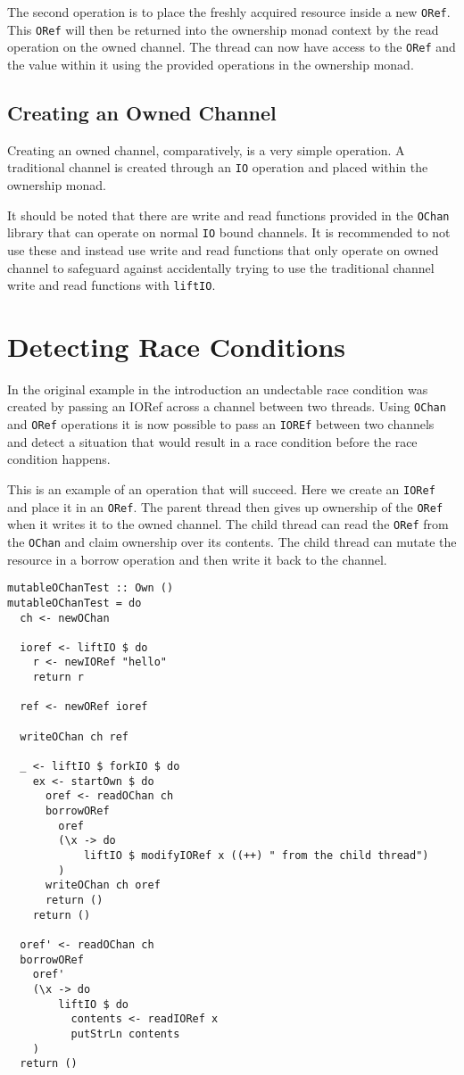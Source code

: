\documentclass[onehalf,11pt]{beavtex}
\begin{document}
The second operation is to place the freshly acquired resource inside a new
\texttt{ORef}.  This \texttt{ORef} will then be returned into the
ownership monad context by the read operation on the
owned channel.  The thread can now have access to the \texttt{ORef}
and the value within it using the provided operations in the
ownership monad.


\subsection{Creating an Owned Channel}

Creating an owned channel, comparatively, is a very simple operation.
A traditional channel is created through an \texttt{IO} operation and placed
within the ownership monad.

It should be noted that there are write and read functions provided
in the \texttt{OChan} library that can operate on normal \texttt{IO} bound
channels.  It is recommended to not use these and instead use write and read
functions that only operate on owned channel to safeguard against
accidentally trying to use the traditional channel write and read functions
with \texttt{liftIO}.

\section{Detecting Race Conditions}

In the original example in the introduction an undectable race condition was
created by passing an IORef across a channel between two threads.
Using \texttt{OChan} and \texttt{ORef} operations it is now possible
to pass an \texttt{IOREf} between two channels and detect a situation
that would result in a race condition before the race condition happens.

This is an example of an operation that will succeed. Here we create an
\texttt{IORef} and place it in an \texttt{ORef}. The parent thread
then gives up ownership of the \texttt{ORef} when it writes it to the
owned channel. The child thread can read the \texttt{ORef} from the
\texttt{OChan} and claim ownership over its contents. The child thread
can mutate the resource in a borrow operation and then write it back to
the channel. 

\begin{verbatim}
mutableOChanTest :: Own ()
mutableOChanTest = do
  ch <- newOChan

  ioref <- liftIO $ do
    r <- newIORef "hello"
    return r

  ref <- newORef ioref

  writeOChan ch ref

  _ <- liftIO $ forkIO $ do
    ex <- startOwn $ do
      oref <- readOChan ch
      borrowORef
        oref
        (\x -> do
            liftIO $ modifyIORef x ((++) " from the child thread")
        )
      writeOChan ch oref
      return ()
    return ()

  oref' <- readOChan ch
  borrowORef
    oref'
    (\x -> do
        liftIO $ do
          contents <- readIORef x
          putStrLn contents
    )
  return ()
\end{verbatim}
\end{document}
